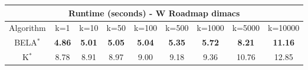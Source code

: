 \begin{tabular}{c|cccccccc}\toprule
\multicolumn{9}{c}{Runtime (seconds) - W Roadmap dimacs}\\ \midrule
Algorithm & k=1 & k=10 & k=50 & k=100 & k=500 & k=1000 & k=5000 & k=10000 \\ \midrule
BELA$^*$ & \textbf{4.86} & \textbf{5.01} & \textbf{5.05} & \textbf{5.04} & \textbf{5.35} & \textbf{5.72} & \textbf{8.21} & \textbf{11.16} \\
K$^*$ & 8.78 & 8.91 & 8.97 & 9.00 & 9.18 & 9.36 & 10.76 & 12.85 \\ \bottomrule 
\end{tabular}
